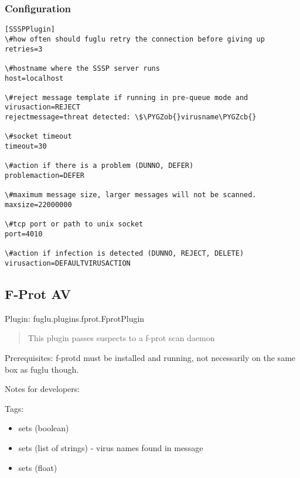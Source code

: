 \documentclass[letterpaper,10pt,english]{sphinxmanual}
\def\PYGZob{\char`\{}
\def\PYGZcb{\char`\}}
\begin{document}
\subsubsection{Configuration}
\label{plugins-index:id5}
\begin{Verbatim}[commandchars=\\\{\}]
[SSSPPlugin]
\#how often should fuglu retry the connection before giving up
retries=3

\#hostname where the SSSP server runs
host=localhost

\#reject message template if running in pre-queue mode and virusaction=REJECT
rejectmessage=threat detected: \$\PYGZob{}virusname\PYGZcb{}

\#socket timeout
timeout=30

\#action if there is a problem (DUNNO, DEFER)
problemaction=DEFER

\#maximum message size, larger messages will not be scanned.
maxsize=22000000

\#tcp port or path to unix socket
port=4010

\#action if infection is detected (DUNNO, REJECT, DELETE)
virusaction=DEFAULTVIRUSACTION
\end{Verbatim}


\subsection{F-Prot AV}
\label{plugins-index:f-prot-av}
Plugin: fuglu.plugins.fprot.FprotPlugin
\begin{quote}

This plugin passes suspects to a f-prot scan daemon
\end{quote}

Prerequisites: f-protd must be installed and running, not necessarily on the same box as fuglu though.

Notes for developers:

Tags:
\begin{itemize}
\item {} 
sets  (boolean)

\item {} 
sets  (list of strings) - virus names found in message

\item {} 
sets  (float)

\end{itemize}
\end{document}
